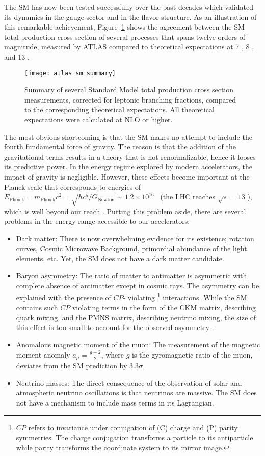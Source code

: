 The SM has now been tested successfully over the past decades which validated its dynamics in the gauge sector and in the flavor structure.
As an illustration of this remarkable achievement, Figure~\ref{fig:theory.sm.summary} shows the agreement between the SM total production cross section
of several processes that spans twelve orders of magnitude, 
measured by ATLAS compared to theoretical expectations 
at 7 \TeV, 8 \TeV, and 13 \TeV.
\begin{figure}[htb!]
\centering
\texttt{[image: atlas\_sm\_summary]}
\caption{Summary of several Standard Model total production cross section measurements, corrected for leptonic branching fractions, compared to the corresponding theoretical expectations. All theoretical expectations were calculated at NLO or higher.}
\label{fig:theory.sm.summary}
\end{figure} 
The most obvious shortcoming is that the SM makes no attempt to include the fourth fundamental force of gravity. 
The reason is that the addition of the gravitational terms results in a theory that is not renormalizable, hence 
it looses its predictive power.
In the energy regime explored by modern accelerators, the impact of gravity is negligible. 
However, these effects become important at the Planck scale that corresponds to energies of 
$E_\text{Planck} = m_\text{Planck} c^2 = \sqrt{\hbar c^5/G_\text{Newton}} \sim 1.2 \times 10^{16}$ \TeV~(the LHC reaches $\sqrt{s}=13$ \TeV), 
which is well beyond our reach \cite{Ade:2013zuv}. 
Putting this problem aside, there are several problems in the energy range accessible to our accelerators:
\begin{itemize}
\item Dark matter: There is now overwhelming evidence for its existence; rotation curves, Cosmic Microwave Background, primordial abundance of the light elements, etc. 
Yet, the SM does not have a dark matter candidate\cite{Bertone:2004pz}.
\item Baryon asymmetry: The ratio of matter to antimatter is asymmetric with complete absence of antimatter except in cosmic rays.
The asymmetry can be explained with the presence of $CP$-
violating
\footnote{$CP$ refers to invariance under conjugation of (C) charge and (P) parity symmetries. 
The charge conjugation transforms a particle to its antiparticle while parity transforms the coordinate system to its mirror image.}
interactions. While the SM contains such $CP$ violating terms in the form of the CKM matrix, describing  quark mixing, and the PMNS matrix, describing neutrino 
mixing, the size of this effect is too small to account for the observed asymmetry \cite{Canetti:2012zc}.
\item Anomalous magnetic moment of the muon: The measurement of the magnetic moment anomaly $a_\mu = \frac{g-2}{2}$, where $g$ is the gyromagnetic ratio of the muon, 
deviates from the SM prediction by 3.3$\sigma$ \cite{PhysRevD.73.072003,Hagiwara:2011af}.
\item Neutrino masses: The direct consequence of the observation of solar and atmospheric neutrino oscillations is that neutrinos are massive. The SM does not have a mechanism to include 
mass terms in its Lagrangian\cite{pdg}.
\end{itemize}
